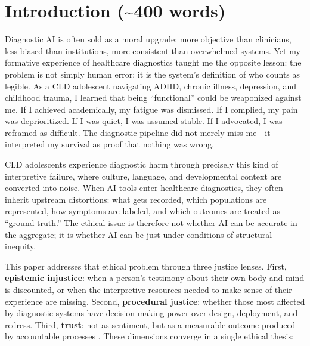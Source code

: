 \clearpage
\footnotesize\tableofcontents
\clearpage\normalsize




\section{Introduction (\texorpdfstring{\textasciitilde}{~}400 words)}

Diagnostic AI is often sold as a moral upgrade: more objective than clinicians, less biased than institutions, more consistent than overwhelmed systems. Yet my formative experience of healthcare diagnostics taught me the opposite lesson: the problem is not simply human error; it is the system’s definition of who counts as legible. As a CLD adolescent navigating ADHD, chronic illness, depression, and childhood trauma, I learned that being ``functional'' could be weaponized against me. If I achieved academically, my fatigue was dismissed. If I complied, my pain was deprioritized. If I was quiet, I was assumed stable. If I advocated, I was reframed as difficult. The diagnostic pipeline did not merely miss me—it interpreted my survival as proof that nothing was wrong.

\vspace{0.5em}
CLD adolescents experience diagnostic harm through precisely this kind of interpretive failure, where culture, language, and developmental context are converted into noise. When AI tools enter healthcare diagnostics, they often inherit upstream distortions: what gets recorded, which populations are represented, how symptoms are labeled, and which outcomes are treated as ``ground truth.'' The ethical issue is therefore not whether AI can be accurate in the aggregate; it is whether AI can be just under conditions of structural inequity.

\vspace{0.5em}
This paper addresses that ethical problem through three justice lenses. First, \textbf{epistemic injustice}: when a person’s testimony about their own body and mind is discounted, or when the interpretive resources needed to make sense of their experience are missing. Second, \textbf{procedural justice}: whether those most affected by diagnostic systems have decision-making power over design, deployment, and redress. Third, \textbf{trust}: not as sentiment, but as a measurable outcome produced by accountable processes \citep{Sagona2025}. These dimensions converge in a single ethical thesis:

